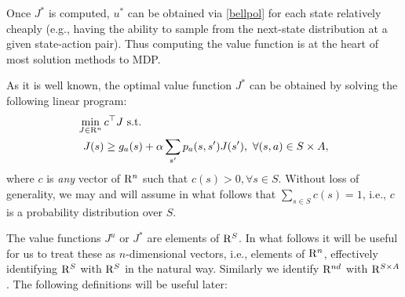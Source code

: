 Once $J^*$ is computed, $u^*$ can be obtained via \eqref{bellpol}
for each state relatively cheaply (e.g., having the ability to sample from the next-state distribution at
a given state-action pair).
Thus computing the value function is at the heart of most solution methods to MDP.\par
As it is well known, the optimal value function $J^*$ can be obtained by solving the following linear program:
\begin{align}\label{mdplp}
\begin{split}
\min_{J\in \R^n}\, &c^\top J\,\,\text{s.t.}\\
J(s)&\geq g_a(s)+\alpha\sum_{s'}p_a(s,s')J(s'),\,\,
\forall (s,a)\in S\times A,
\end{split}
\end{align}
where $c$ is \emph{any} vector of $\mathrm{R}^n$ such that $c(s)>0, \forall s \in S$. Without loss of generality, we may and will assume in what follows that $\sum_{s\in S}c(s)=1$, i.e., $c$ is a probability distribution over $S$.\par
The value functions $J^u$ or $J^*$ are elements of $\mathrm{R}^S$.
In what follows it will be useful for us to treat these as $n$-dimensional vectors, i.e., elements of $\mathrm{R}^n$, effectively identifying $\mathrm{R}^S$ with $\mathrm{R}^S$ in the natural way. Similarly we identify $\mathrm{R}^{nd}$ with $\mathrm{R}^{S\times A}$.
The following definitions will be useful later:
